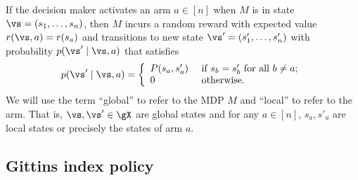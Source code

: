 If the decision maker activates an arm $a\in[n]$ when $M$ is in state $\vs=(s_1,\dots,s_n)$, then $M$ incurs a random reward with expected value $r(\vs,a)=r(s_a)$ and transitions to new state $\vs'=(s'_1,\dots,s'_n)$ with probability $p(\vs'\mid \vs, a)$ that satisfies
\begin{equation}
    \label{ch:mb:P_defn}
    p(\vs'\mid \vs, a)
    = 
    \left\{
        \begin{array}{ll}
            P(s_a,s'_a) & \text{ if $s_b=s'_b$ for all $b\ne a$;}\\
            0 &\text{ otherwise}.
        \end{array}
    \right.
\end{equation}
We will use the term ``global'' to refer to the MDP $M$ and ``local'' to refer to the arm.
That is, $\vs, \vs'\in\gX$ are global states and for any $a\in[n]$, $s_a,s'_a$ are local states or precisely the states of arm $a$.

\subsection{Gittins index policy}
\label{ssec:gittins_idx}

